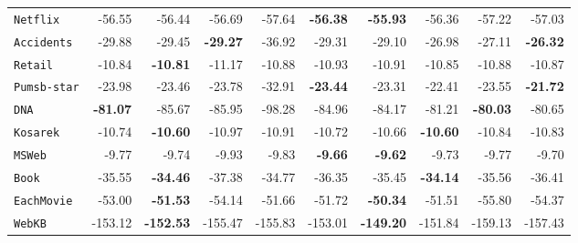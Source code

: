 \documentclass[final]{beamer}
\begin{document}
\begin{frame}{}
\begin{textblock}{17.5}
\begin{table}[t]
\begin{tabular}{l r r r r  r  r r r r}
    \texttt{Netflix}    & -56.55                               & -56.44                                & -56.69                 & -57.64  & \textbf{-56.38}  & \textbf{-55.93}  & -56.36         & -57.22          & -57.03          \\ 
    \texttt{Accidents}  & -29.88                               & -29.45                                & \textbf{-29.27}                 & -36.92  & -29.31  & -29.10           & -26.98         & -27.11          & \textbf{-26.32} \\ 
    \texttt{Retail}     & -10.84                               & \textbf{-10.81}                                & -11.17                 & -10.88  & -10.93  & -10.91           & -10.85         & -10.88          & -10.87          \\ 
    \texttt{Pumsb-star} & -23.98                               & -23.46                                & -23.78                 & -32.91  & \textbf{-23.44}  & -23.31           & -22.41         & -23.55          & \textbf{-21.72} \\ 
    \texttt{DNA}        &\textbf{-81.07}                               & -85.67                                & -85.95                 & -98.28  & -84.96  & -84.17           & -81.21         & \textbf{-80.03} & -80.65          \\ 
    \texttt{Kosarek}    & -10.74                               & \textbf{-10.60}                                & -10.97                 & -10.91  & -10.72  & -10.66           & \textbf{-10.60}         & -10.84          & -10.83          \\ 
    \texttt{MSWeb}      & -9.77                                & -9.74                                 & -9.93                  & -9.83   & \textbf{-9.66}   & \textbf{-9.62}   & -9.73          & -9.77           & -9.70           \\ 
    \texttt{Book}       & -35.55                               & \textbf{-34.46}                                & -37.38                 & -34.77  & -36.35  & -35.45           & \textbf{-34.14}         & -35.56          & -36.41          \\ 
    \texttt{EachMovie}  & -53.00                               & \textbf{-51.53}                                & -54.14                 & -51.66  & -51.72  & \textbf{-50.34}  & -51.51         & -55.80          & -54.37          \\ 
    \texttt{WebKB}      & -153.12                              & \textbf{-152.53}                               & -155.47                & -155.83 & -153.01 & \textbf{-149.20} & -151.84        & -159.13         & -157.43         \\ 

\end{tabular}
\end{table}
\end{textblock}
\end{frame}
\end{document}
